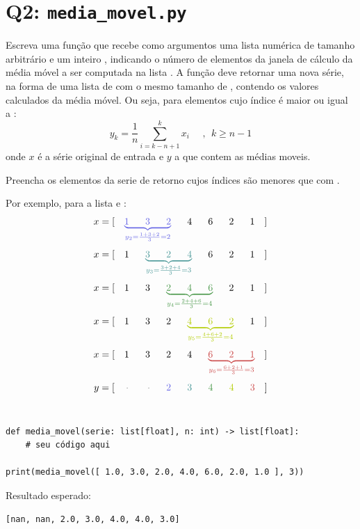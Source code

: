 \section*{Q2: \texttt{media\_movel.py}}


Escreva uma função  que recebe como argumentos uma
lista numérica  de tamanho arbitrário e um inteiro , indicando o
número de elementos da janela de cálculo da média móvel a ser computada na lista .
A função deve retornar uma nova série, na forma de uma lista de  com o  mesmo tamanho de ,
contendo os valores calculados da média móvel.
Ou seja, para elementos cujo índice é maior ou igual a :
\begin{equation}
    y_{k} =
        \dfrac{1}{n}\sum_{i=k-n+1}^k x_i \ \ \ \ \ \ , \ \   k \geq n-1
\end{equation}
onde $x$ é a série original de entrada e $y$ a que contem as médias moveis.

Preencha os elementos da serie de retorno cujos índices são menores que  com \inlcode{)}.

Por exemplo, para a lista \inlcode{[ 1.0, 3.0, 2.0, 4.0, 6.0, 2.0, 1.0 ]} e :
    $$
    x = [~~~ \textcolor{c1}{\underbrace{1~~~~~ 3~~~~~ 2}_{y_2 = \frac{1+3+2}{3}=2}}~~~~~ 4~~~~~ 6~~~~~ 2~~~~~ 1~~~ ]
    $$
    \vspace{-3mm}$$
    x = [~~~ 1~~~~~ \textcolor{c2}{\underbrace{3~~~~~ 2~~~~~ 4}_{y_3 = \frac{3+2+4}{3}=3}}~~~~~ 6~~~~~ 2~~~~~ 1~~~ ]
    $$
    \vspace{-3mm}$$
    x = [~~~ 1~~~~~ 3~~~~~ \textcolor{c3}{\underbrace{ 2~~~~~ 4~~~~~ 6}_{y_4 = \frac{2+4+6}{3}=4}}~~~~~ 2~~~~~ 1~~~ ]
    $$
    \vspace{-3mm}$$
    x = [~~~ 1~~~~~ 3~~~~~ 2~~~~~ \textcolor{c4}{\underbrace{ 4~~~~~ 6~~~~~ 2}_{y_5 = \frac{4+6+2}{3}=4}}~~~~~ 1~~~]
    $$
    \vspace{-3mm}$$
    x = [~~~ 1~~~~~ 3~~~~~ 2~~~~~ 4~~~~~ \textcolor{c5}{\underbrace{ 6~~~~~ 2~~~~~ 1}_{y_6 = \frac{6+2+1}{3}=3}} ~~~]
    $$
    \vspace{-3mm}$$
    y = [~~~ \, \textcolor{c0}{\cdot} \; ~~~~~ \textcolor{c0}{\cdot} ~~~~~ \textcolor{c1}{2}~~~~~ \textcolor{c2}{3}~~~~~ \textcolor{c3}{4}~~~~~ \textcolor{c4}{4}~~~~~ \textcolor{c5}{3}~~~ ]
    $$
    \\

\begin{verbatim}
def media_movel(serie: list[float], n: int) -> list[float]:
    # seu código aqui

print(media_movel([ 1.0, 3.0, 2.0, 4.0, 6.0, 2.0, 1.0 ], 3))
\end{verbatim}

Resultado esperado:
\begin{verbatim}
[nan, nan, 2.0, 3.0, 4.0, 4.0, 3.0]
\end{verbatim}




